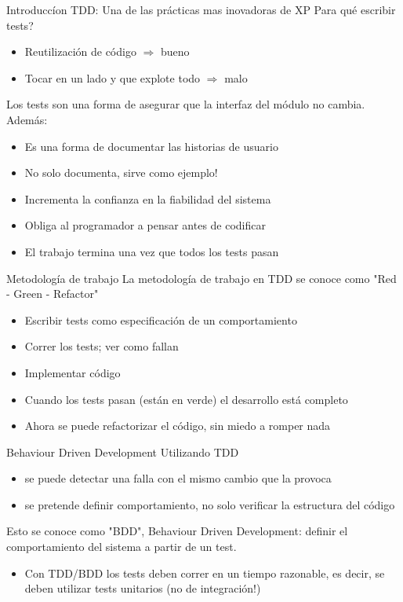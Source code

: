 \documentclass{beamer}
\begin{document}
\begin{frame}{Introducc\'ion}
TDD: Una de las pr\'acticas mas inovadoras de XP
\textquestiondown Para qu\'e escribir tests?
\begin{itemize}
          \item Reutilizaci\'on de c\'odigo $\Rightarrow$ bueno
          \item Tocar en un lado y que explote todo $\Rightarrow$ malo
\end{itemize}
Los tests son una forma de asegurar que la interfaz del m\'odulo no cambia.
Adem\'as:
\begin{itemize}
        \item Es una forma de documentar las historias de usuario
        \item No solo documenta, sirve como ejemplo!
        \item Incrementa la confianza en la fiabilidad del sistema
        \item Obliga al programador a pensar antes de codificar
        \item El trabajo termina una vez que todos los tests pasan
\end{itemize}
\end{frame}

\begin{frame}{Metodolog\'ia de trabajo}
La metodolog\'ia de trabajo en TDD se conoce como "Red - Green - Refactor"
\begin{itemize}
        \item Escribir tests como especificaci\'on de un comportamiento
        \item Correr los tests; ver como fallan
        \item Implementar c\'odigo
        \item Cuando los tests pasan (est\'an en verde) el desarrollo est\'a completo
        \item Ahora se puede refactorizar el c\'odigo, sin miedo a romper nada
\end{itemize}
\end{frame}

\begin{frame}{Behaviour Driven Development}
Utilizando TDD
\begin{itemize}
        \item se puede detectar una falla con el mismo cambio que la provoca
        \item se pretende definir comportamiento, no solo verificar la estructura del c\'odigo
\end{itemize}
Esto se conoce como "BDD", Behaviour Driven Development: definir el comportamiento del sistema a partir de un test.
\begin{itemize}
        \item Con TDD/BDD los tests deben correr en un tiempo razonable, es decir, se deben utilizar tests unitarios (no de integraci\'on!)
\end{itemize}
\end{frame}
\end{document}
